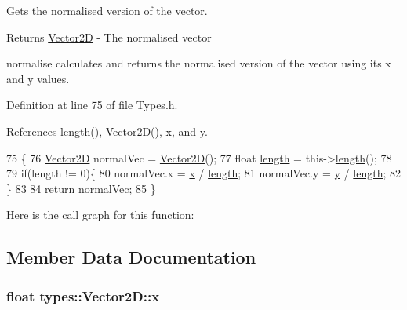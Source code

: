 Gets the normalised version of the vector. 

\begin{DoxyReturn}{Returns}
\hyperlink{structtypes_1_1_vector2_d}{Vector2\+D} -\/ The normalised vector
\end{DoxyReturn}
normalise calculates and returns the normalised version of the vector using its x and y values. 

Definition at line 75 of file Types.\+h.



References length(), Vector2\+D(), x, and y.


\begin{DoxyCode}
75                             \{
76             \hyperlink{structtypes_1_1_vector2_d_adda77a848bdd16a1a5ef040f6b2eb22a}{Vector2D} normalVec = \hyperlink{structtypes_1_1_vector2_d_adda77a848bdd16a1a5ef040f6b2eb22a}{Vector2D}();
77             \textcolor{keywordtype}{float} \hyperlink{structtypes_1_1_vector2_d_ac46977660e97a02defb9410870b287b7}{length} = this->\hyperlink{structtypes_1_1_vector2_d_ac46977660e97a02defb9410870b287b7}{length}();
78 
79             \textcolor{keywordflow}{if}(length != 0)\{
80                 normalVec.x = \hyperlink{structtypes_1_1_vector2_d_a44560592e290e47cf312c76931cace2d}{x} / \hyperlink{structtypes_1_1_vector2_d_ac46977660e97a02defb9410870b287b7}{length};
81                 normalVec.y = \hyperlink{structtypes_1_1_vector2_d_af91db0a84d6cc1645b0b4fc79aca835f}{y} / \hyperlink{structtypes_1_1_vector2_d_ac46977660e97a02defb9410870b287b7}{length};
82             \}
83 
84             \textcolor{keywordflow}{return} normalVec;
85         \}
\end{DoxyCode}


Here is the call graph for this function\+:




\subsection{Member Data Documentation}
\hypertarget{structtypes_1_1_vector2_d_a44560592e290e47cf312c76931cace2d}{}
\subsubsection[{x}]{\setlength{\rightskip}{0pt plus 5cm}float types\+::\+Vector2\+D\+::x}\label{structtypes_1_1_vector2_d_a44560592e290e47cf312c76931cace2d}


